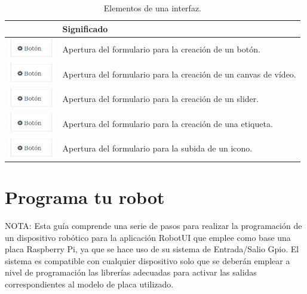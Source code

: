 \begin{table}[H]
  \begin{center}
    \begin{tabular}{|p{2cm}|p{10cm}|}
      \hline
      \centering{Botón} & \qquad \quad Significado \\
      \hline
      \includegraphics[width=2cm]{imagenes/manual-usuario/nuevo-boton.png} & Apertura del formulario para la creación de un botón. \\
      \hline
      \includegraphics[width=2cm]{imagenes/manual-usuario/nuevo-boton.png} & Apertura del formulario para la creación de un canvas de vídeo. \\
      \hline
      \includegraphics[width=2cm]{imagenes/manual-usuario/nuevo-boton.png} & Apertura del formulario para la creación de un slider. \\
      \hline
      \includegraphics[width=2cm]{imagenes/manual-usuario/nuevo-boton.png} & Apertura del formulario para la creación de una etiqueta. \\
      \hline
      \includegraphics[width=2cm]{imagenes/manual-usuario/nuevo-boton.png} & Apertura del formulario para la subida de un icono. \\
      \hline
    \end{tabular}
  \end{center}
\caption{Elementos de una interfaz.}
\end{table}


\section{ Programa tu robot }
\label{sec:programacion-robot}

NOTA: Esta guía comprende una serie de pasos para realizar la programación de un dispositivo robótico para la aplicación RobotUI que emplee como base una placa Raspberry Pi, ya que se hace uso de su sistema de Entrada/Salio Gpio. 
El sistema es compatible con cualquier dispositivo solo que se deberán emplear a nivel de programación las librerías adecuadas para activar las salidas correspondientes al modelo de placa utilizado.\\


